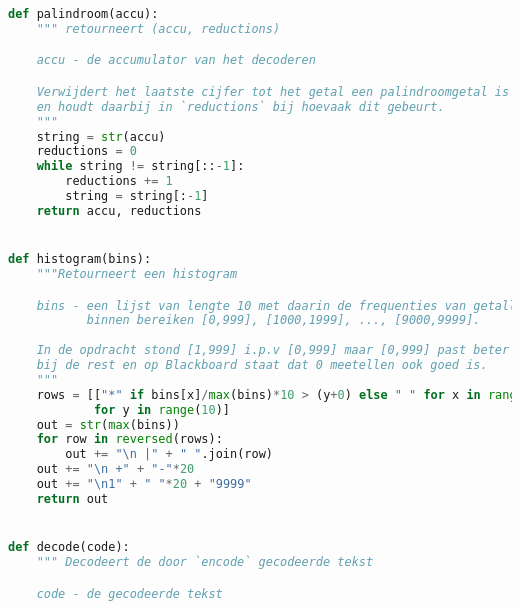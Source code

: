 \documentclass{article}
\begin{document}
\begin{lstlisting}[frame=single, language=python]
def palindroom(accu):
    """ retourneert (accu, reductions)

    accu - de accumulator van het decoderen

    Verwijdert het laatste cijfer tot het getal een palindroomgetal is
    en houdt daarbij in `reductions` bij hoevaak dit gebeurt.
    """
    string = str(accu)
    reductions = 0
    while string != string[::-1]:
        reductions += 1
        string = string[:-1]
    return accu, reductions


def histogram(bins):
    """Retourneert een histogram

    bins - een lijst van lengte 10 met daarin de frequenties van getallen
           binnen bereiken [0,999], [1000,1999], ..., [9000,9999].
 
    In de opdracht stond [1,999] i.p.v [0,999] maar [0,999] past beter
    bij de rest en op Blackboard staat dat 0 meetellen ook goed is.
    """
    rows = [["*" if bins[x]/max(bins)*10 > (y+0) else " " for x in range(10)]
            for y in range(10)]
    out = str(max(bins))
    for row in reversed(rows):
        out += "\n |" + " ".join(row)
    out += "\n +" + "-"*20
    out += "\n1" + " "*20 + "9999"
    return out


def decode(code):
    """ Decodeert de door `encode` gecodeerde tekst

    code - de gecodeerde tekst


\end{lstlisting}
\end{document}
